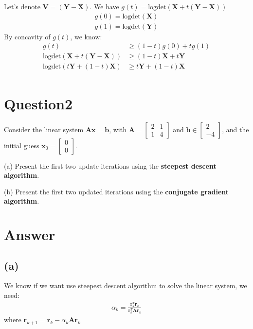 \documentclass{article}
\begin{document}
Let's denote \(\bm{V} = (\bm{Y} - \bm{X})\). We have \(g(t) = \text{log} \text{det} (\bm{X} + t(\bm{Y} - \bm{X})) \)
\begin{align*}
    g(0) = \text{log} \text{det} (\bm{X})  \\
    g(1) = \text{log} \text{det} (\bm{Y}) 
\end{align*}
By concavity of \(g(t)\), we know:
\begin{align*}
    g(t) &\geq (1 - t) g(0) + t g(1) \\
    \text{log} \text{det} (\bm{X} + t(\bm{Y} - \bm{X})) &\geq (1 - t) \bm{X} + t \bm{Y} \\
    \text{log} \text{det} (t\bm{Y} + (1 - t)\bm{X}) &\geq t \bm{Y} + (1 - t) \bm{X}  \\
\end{align*}





\section*{Question2}
Consider the linear system \(\bm{Ax} = \bm{b}\), with \(\bm{A} = \begin{bmatrix}
    2 & 1\\
    1 & 4
\end{bmatrix}\) and \(\bm{b} \in \begin{bmatrix}
    2 \\
    -4
\end{bmatrix}\), and the initial guess \(\bm{x}_0 = \begin{bmatrix}
    0 \\
    0
\end{bmatrix}\).

(a) Present the first two update iterations using the \textbf{steepest descent algorithm}. 

(b) Present the first two updated iterations using the \textbf{conjugate gradient algorithm}.


\section*{Answer}
\subsection*{(a)}
We know if we want use steepest descent algorithm to solve the linear system, we need:
\begin{align*}
    \alpha_k = \frac{\bm{r}_k^T\bm{r}_k}{\bm{r}_k^T\bm{A}\bm{r}_k}
\end{align*}
where \(\bm{r}_{k+1} = \bm{r}_k - \alpha_k \bm{A} \bm{r}_k\)
\end{document}

